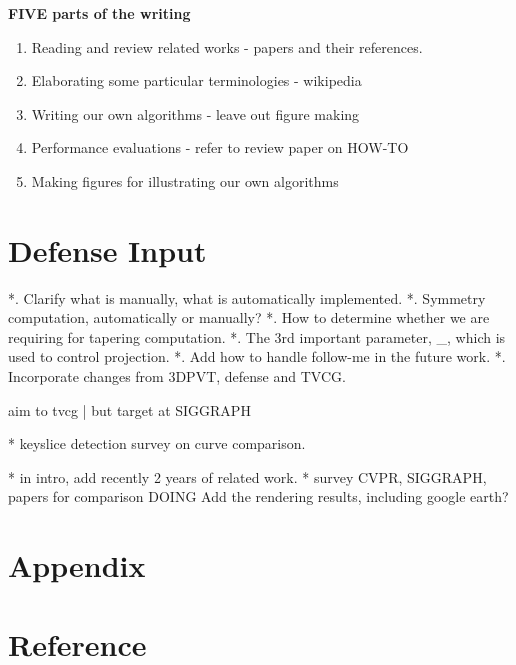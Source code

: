 \iffalse

{\bf FIVE parts of the writing}
\begin{enumerate}
\item {Reading and review related works - papers and their references.}
\item {Elaborating some particular terminologies - wikipedia}
\item {Writing our own algorithms - leave out figure making}
\item {Performance evaluations - refer to review paper on HOW-TO}
\item {Making figures for illustrating our own algorithms}
\end{enumerate}

\newpage

\section{Defense Input}

*. Clarify what is manually, what is automatically implemented.
*. Symmetry computation, automatically or manually?
*. How to determine whether we are requiring for tapering computation.
*. The 3rd important parameter, \tau_\delta, which is used to control projection.
*. Add how to handle follow-me in the future work.
*. Incorporate changes from 3DPVT, defense and TVCG.

aim to tvcg | but target at SIGGRAPH

* keyslice detection survey on curve comparison.

* in intro, add recently 2 years of related work.
* survey CVPR, SIGGRAPH, papers for comparison
DOING  Add the rendering results, including google earth?

\section{Appendix}

\section{Reference}


